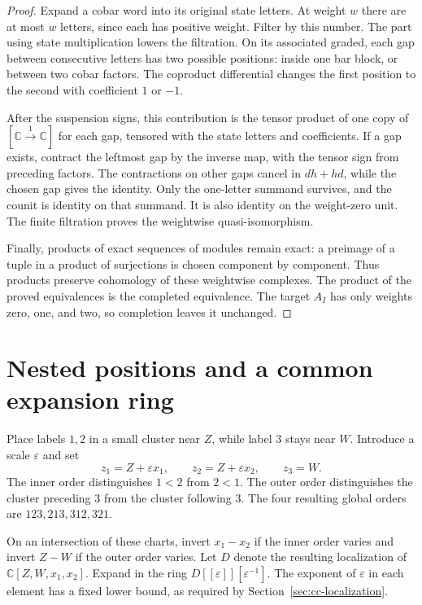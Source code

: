 \begin{proof}
Expand a cobar word into its original state letters.
At weight $w$ there are at most $w$ letters, since each has
positive weight. Filter by this number.
The part using state multiplication lowers the filtration.
On its associated graded, each gap between consecutive letters
has two possible positions: inside one bar block, or between two
cobar factors.
The coproduct differential changes the first position to the
second with coefficient $1$ or $-1$.

After the suspension signs, this contribution is the tensor
product of one copy of $[\mathbb C\xrightarrow{1}\mathbb C]$
for each gap, tensored with the state letters and coefficients.
If a gap exists, contract the leftmost gap by the inverse map,
with the tensor sign from preceding factors.
The contractions on other gaps cancel in $dh+hd$, while the
chosen gap gives the identity.
Only the one-letter summand survives, and the counit is identity
on that summand. It is also identity on the weight-zero unit.
The finite filtration proves the weightwise quasi-isomorphism.

Finally, products of exact sequences of modules remain exact:
a preimage of a tuple in a product of surjections is chosen
component by component.
Thus products preserve cohomology of these weightwise complexes.
The product of the proved equivalences is the completed
equivalence. The target $A_I$ has only weights zero, one, and
two, so completion leaves it unchanged.
\end{proof}

\section{Nested positions and a common expansion ring}

Place labels $1,2$ in a small cluster near $Z$, while label $3$
stays near $W$. Introduce a scale $\varepsilon$ and set
\[
 z_1=Z+\varepsilon x_1,\qquad
 z_2=Z+\varepsilon x_2,\qquad z_3=W.
\]
The inner order distinguishes $1<2$ from $2<1$.
The outer order distinguishes the cluster preceding $3$ from
the cluster following $3$.
The four resulting global orders are $123,213,312,321$.

On an intersection of these charts, invert $x_1-x_2$ if the inner
order varies and invert $Z-W$ if the outer order varies.
Let $D$ denote the resulting localization of
$\mathbb C[Z,W,x_1,x_2]$.
Expand in the ring
$D[[\varepsilon]][\varepsilon^{-1}]$.
The exponent of $\varepsilon$ in each element has a fixed lower
bound, as required by Section~\ref{sec:cc-localization}.

